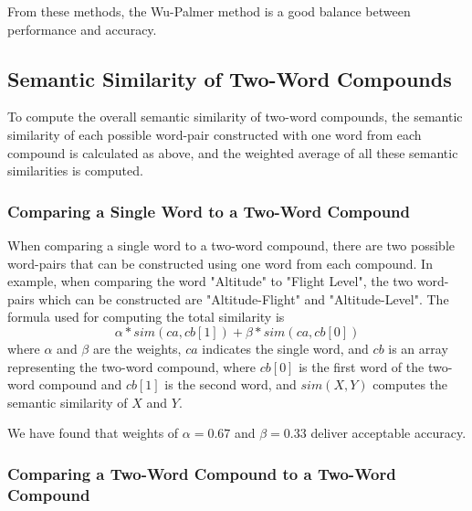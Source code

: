 \documentclass{article}
\begin{document}
From these methods, the Wu-Palmer method is a good balance between performance and accuracy\cite{budanitsky2006evaluating,seco2004intrinsic,mihalcea2006corpus}.

\subsection{Semantic Similarity of Two-Word Compounds}

To compute the overall semantic similarity of two-word compounds, the semantic similarity of each possible word-pair constructed with one word from each compound is calculated as above, and the weighted average of all these semantic similarities is computed.

\subsubsection{Comparing a Single Word to a Two-Word Compound}

When comparing a single word to a two-word compound, there are two possible word-pairs that can be constructed using one word from each compound. In example, when comparing the word "Altitude" to "Flight Level", the two word-pairs which can be constructed are "Altitude-Flight" and "Altitude-Level".
The formula used for computing the total similarity is 
\begin{equation} \label{eq:1wordto2word}
	\alpha * sim(ca, cb[1]) + \beta * sim(ca, cb[0])
\end{equation}
where $ \alpha $ and $ \beta $ are the weights, $ ca $ indicates the single word, and $ cb $ is an array representing the two-word compound, where $ cb[0] $ is the first word of the two-word compound and $ cb[1] $ is the second word, and $ sim(X,Y) $ computes the semantic similarity of $ X $ and $ Y $. %

We have found that weights of $ \alpha = 0.67 $ and $ \beta = 0.33 $ deliver acceptable accuracy. %

\subsubsection{Comparing a Two-Word Compound to a Two-Word Compound}
\end{document}
